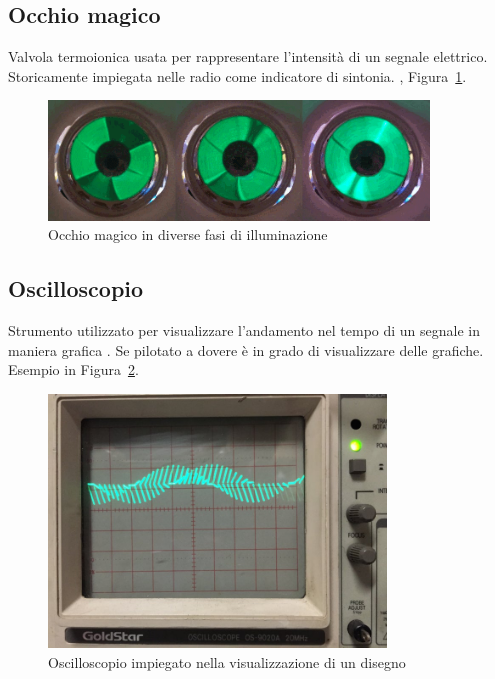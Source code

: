 \documentclass[12pt,a4paper]{report}
\begin{document}
\subsection{Occhio magico}
Valvola termoionica usata per rappresentare l'intensità di un segnale elettrico. Storicamente impiegata nelle radio come
indicatore di sintonia. \cite{itwiki:119250611}, Figura~\ref{fig:occhiomagicofasi}.

\begin{figure}[h]
  \centering
  \includegraphics[width=0.9\textwidth]{occhiomagicofasi}
  \caption{Occhio magico in diverse fasi di illuminazione \cite{itwiki:119250611}}
  \label{fig:occhiomagicofasi}
\end{figure}

\subsection{Oscilloscopio}
Strumento utilizzato per visualizzare l'andamento nel tempo di un segnale in maniera grafica \cite{itwiki:120862120}. Se pilotato a dovere è in grado di
visualizzare delle grafiche. Esempio in Figura~\ref{fig:oscilloscopio}.

\begin{figure}[h]
  \centering
  \includegraphics[width=0.8\textwidth]{oscilloscopio}
  \caption{Oscilloscopio impiegato nella visualizzazione di un disegno \cite{instructablesoscilloscope}}
  \label{fig:oscilloscopio}
\end{figure}
\end{document}
